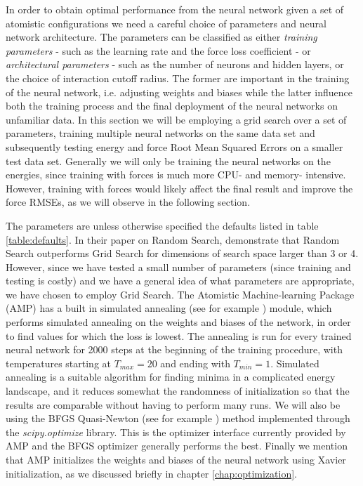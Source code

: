 In order to obtain optimal performance from the neural network
given a set of atomistic configurations we need a careful choice of parameters
and neural network architecture. The parameters can be classified as either
\textit{training parameters} - such as the learning rate 
and the force loss coefficient -
or \textit{architectural parameters} - 
such as the number of neurons and hidden layers,
or the choice of interaction cutoff radius. The former are important
in the training of the neural network, i.e. adjusting weights and biases
while the latter influence both the training process and the final
deployment of the neural networks on unfamiliar data.
In this section we will be employing a grid search over a set of
parameters, training multiple neural networks on the same data set
and subsequently testing energy and force Root Mean Squared Errors on
a smaller test data set. Generally we will only be training the neural networks
on the energies, since training with forces is much more CPU- and memory-
intensive. However, training with forces would likely affect the final
result and improve the force RMSEs, as we will observe in the following section.
\par
The parameters are unless otherwise specified the defaults listed
in table \ref{table:defaults}.
In their paper on Random Search, \parencite[Bergstra and Bengio]{
    bergstra2012random}
demonstrate that Random Search outperforms Grid Search for dimensions
of search space larger than 3 or 4. However, since we have tested
a small number of parameters (since training and testing is costly)
and we have a general idea of what parameters are appropriate, we
have chosen to employ Grid Search.
The Atomistic Machine-learning Package (AMP) 
has a built in simulated annealing (see for example \cite{
    bertsimas1993simulated}) module, which performs
simulated annealing on the weights and biases of the network,
in order to find values for which the loss is lowest.
The annealing is run for every trained neural network
for 2000 steps at the beginning of the training procedure,
with temperatures starting at $T_{max} = 20$ and ending with $T_{min} = 1$.
Simulated annealing is a suitable algorithm for finding minima
in a complicated energy landscape, and it reduces somewhat
the randomness of initialization so that the results are comparable
without having to perform many runs.
We will also be using the BFGS Quasi-Newton (see for example \cite{
    bonnans2006numerical}) method implemented
through the \textit{scipy.optimize} library. This is
the optimizer interface currently provided by AMP
and the BFGS optimizer generally performs the best.
Finally we mention that AMP initializes the weights and biases
of the neural network using Xavier initialization\cite{glorot2010understanding},
as we discussed briefly in chapter \ref{chap:optimization}.

